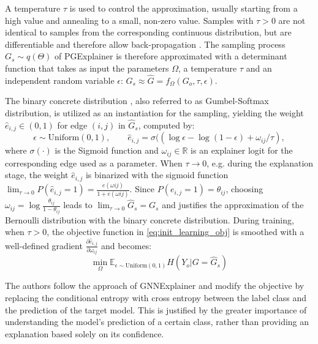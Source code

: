 A temperature $\tau$ is used to control the approximation, usually starting from a high value and annealing to a small, non-zero value. Samples with $\tau > 0$ are not identical to samples from the corresponding continuous distribution, but are differentiable and therefore allow back-propagation \cite{abid2019concrete}. The sampling process $G_s \sim q(\Theta)$ of PGExplainer is therefore approximated with a determinant function that takes as input the parameters $\Omega$, a temperature $\tau$ and an independent random variable $\epsilon$: $G_s \approx \hat{G}=f_\Omega(G_o,\tau,\epsilon)$. 

The binary concrete distribution \cite{maddison2016concrete}, also referred to as Gumbel-Softmax distribution, is utilized as an instantiation for the sampling, yielding the weight $\hat{e}_{i,j} \in (0,1)$ for edge $(i,j)$ in $\hat{G}_s$, computed by:
\begin{equation}
    \label{eq:reparam_trick}
    \epsilon \sim \text{Uniform}(0,1), \qquad \hat{e}_{i,j}=\sigma((\log \epsilon - \log(1-\epsilon)+\omega_{ij}/\tau),
\end{equation}
where $\sigma(\cdot)$ is the Sigmoid function and $\omega_{ij} \in \mathbb{R}$ is an explainer logit for the corresponding edge used as a parameter. When $\tau \rightarrow 0$, e.g. during the explanation stage, the weight $\hat{e}_{i,j}$ is binarized with the sigmoid function $\lim_{\tau\rightarrow 0}P(\hat{e}_{i,j} = 1) = \frac{e(\omega{ij})}{1+e(\omega{ij})}$. Since $P(e_{i,j} = 1) = \theta_{ij}$, choosing $\omega_{ij} = \log\frac{\theta_{ij}}{1-\theta_{ij}}$ leads to $\lim_{\tau\rightarrow 0}\hat{G}_s = G_s$ and justifies the approximation of the Bernoulli distribution with the binary concrete distribution. During training, when $\tau > 0$, the objective function in \eqref{eq:init_learning_obj} is smoothed with a well-defined gradient $\frac{\partial\hat{e}_{i,j}}{\partial\omega_{ij}}$ and becomes:
\begin{equation}
    \min_\Omega \mathbb{E}_{\epsilon \sim \text{Uniform}(0,1)}H(Y_o| G = \hat{G}_s)
\end{equation}

The authors follow the approach of GNNExplainer \cite{ying2019gnnexplainer} and modify the objective by replacing the conditional entropy with cross entropy between the label class and the prediction of the target model. This is justified by the greater importance of understanding the model's prediction of a certain class, rather than providing an explanation based solely on its confidence.

